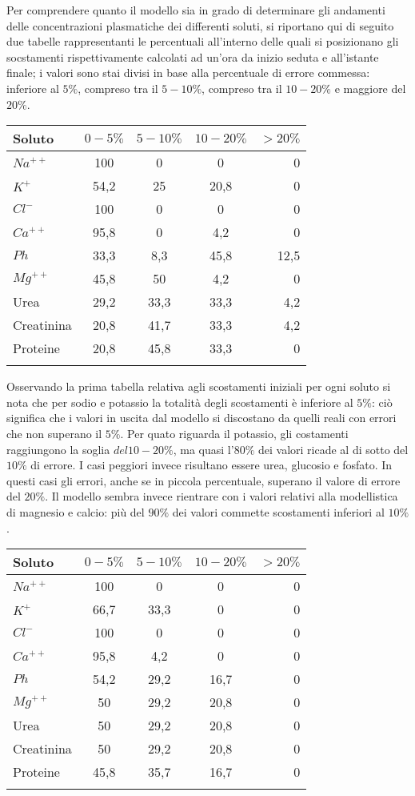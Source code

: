 \documentclass[10pt,twoside]{book}
\begin{document}
Per comprendere quanto il modello sia in grado di determinare gli andamenti delle concentrazioni plasmatiche dei differenti soluti, si riportano qui di seguito due tabelle rappresentanti le percentuali all'interno delle quali si posizionano gli socstamenti rispettivamente calcolati ad un'ora da inizio seduta e all'istante finale; i valori sono stai divisi in base alla percentuale di errore commessa: inferiore al $5\%$, compreso tra il $5-10\%$, compreso tra il $10-20\%$ e maggiore del $20\%$.
\newline
\begin{tabular}{lcccr}
\toprule
Soluto & $0-5\%$ & $5-10\%$ & $10-20\%$ & $>20\%$\\
\midrule
$Na^{++}$& 100 & 0 & 0 & 0\\
$K^{+}$ & 54,2 & 25 & 20,8 & 0\\ 
$Cl^{-}$& 100 & 0 & 0 & 0\\
$Ca^{++}$& 95,8 &  0 & 4,2 & 0\\
$Ph$ & 33,3 &  8,3 & 45,8 & 12,5\\
$Mg^{++}$& 45,8 &  50 & 4,2 & 0\\
Urea & 29,2 & 33,3 & 33,3 & 4,2\\
Creatinina & 20,8 & 41,7 & 33,3 & 4,2\\
Proteine & 20,8 &  45,8 & 33,3 & 0\\
\bottomrule
\caption{Percentuali scostamenti iniziali }
\end{tabular}
\newline
Osservando la prima tabella relativa agli scostamenti iniziali per ogni soluto si nota che per sodio e potassio la totalità degli scostamenti è inferiore al $5\%$: ciò significa che i valori in uscita dal modello si discostano da quelli reali con errori che non superano il $5\%$. Per quato riguarda il potassio, gli costamenti raggiungono la soglia $del 10-20\%$, ma quasi l'$80\%$ dei valori ricade al di sotto del $10\%$ di errore. I casi peggiori invece risultano essere urea, glucosio e fosfato. In questi casi gli errori, anche se in piccola percentuale, superano il valore di errore del $20\%$. Il modello sembra invece rientrare con i valori relativi alla modellistica di magnesio e calcio: più del $90\%$ dei valori commette scostamenti inferiori al $10\%$. 
\newline
\begin{tabular}{lcccr}
\toprule
Soluto & $0-5\%$ & $5-10\%$ & $10-20\%$ & $>20\%$\\
\midrule
$Na^{++}$& 100 & 0 & 0 & 0\\
$K^{+}$ & 66,7 & 33,3 & 0 & 0\\ 
$Cl^{-}$& 100 & 0 & 0 & 0\\
$Ca^{++}$& 95,8 & 4,2 & 0 & 0\\
$Ph$ & 54,2 &  29,2 & 16,7 & 0\\
$Mg^{++}$& 50 &  29,2 & 20,8 & 0\\
Urea & 50 & 29,2 & 20,8 & 0\\
Creatinina & 50 & 29,2 & 20,8 & 0\\
Proteine & 45,8 &  35,7 & 16,7 & 0\\
\bottomrule
\caption{Percentuali scostamenti fine seduta}
\end{tabular}
\end{document}
